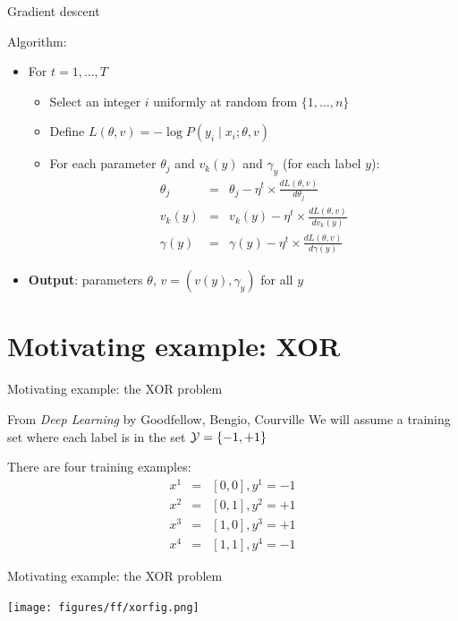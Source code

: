 \begin{frame}{Gradient descent}
\begin{block}{Algorithm:}
\begin{itemize}[<+->]
\item For $t = 1, \ldots, T$
\begin{itemize}[<+->]
\item Select an integer $i$ uniformly at random from $\{ 1, \ldots, n \}$
\item Define $L(\theta, v) = - \log P(y_i \mid x_i; \theta, v)$
\item For each parameter $\theta_j$ and $v_k(y)$ and $\gamma_y$ (for each label $y$):
\begin{eqnarray*}
\theta_j &=& \theta_j - \eta^t \times \frac{dL(\theta,v)}{d\theta_j} \\
v_k(y) &=& v_k(y) - \eta^t \times \frac{dL(\theta,v)}{d v_k(y)} \\
\gamma(y) &=& \gamma(y) - \eta^t \times \frac{dL(\theta,v)}{d \gamma(y)}
\end{eqnarray*}
\end{itemize}
\item \textbf{Output}: parameters $\theta$, $v = (v(y), \gamma_y)$ for all $y$
\end{itemize}
\end{block}
\end{frame}

\section{Motivating example: XOR}
\frame{\tableofcontents[currentsection]}

\begin{frame}{Motivating example: the XOR problem}
\begin{block}{From \textit{Deep Learning} by Goodfellow, Bengio, Courville}
We will assume a training set where each label is in the set ${\cal Y} = \{ -1, +1 \}$

There are four training examples:
\begin{eqnarray*}
x^1 &=& [0,0], y^1 = -1\\
x^2 &=& [0,1], y^2 = +1 \\
x^3 &=& [1,0], y^3 = +1\\
x^4 &=& [1,1], y^4 = -1
\end{eqnarray*}
\end{block}
\end{frame}

\begin{frame}{Motivating example: the XOR problem}
\begin{block}{}
\texttt{[image: figures/ff/xorfig.png]}
\end{block}
\end{frame}

